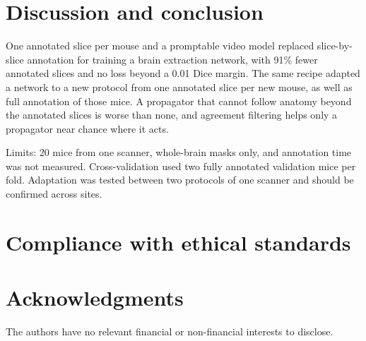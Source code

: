 \section{Discussion and conclusion}
\label{sec:discussion}
One annotated slice per mouse and a promptable video model replaced slice-by-slice annotation for training a brain extraction network, with 91\% fewer annotated slices and no loss beyond a 0.01 Dice margin. The same recipe adapted a network to a new protocol from one annotated slice per new mouse, as well as full annotation of those mice. A propagator that cannot follow anatomy beyond the annotated slices is worse than none, and agreement filtering helps only a propagator near chance where it acts.

Limits: 20 mice from one scanner, whole-brain masks only, and annotation time was not measured. Cross-validation used two fully annotated validation mice per fold. Adaptation was tested between two protocols of one scanner and should be confirmed across sites.

\section{Compliance with ethical standards}
\label{sec:ethics}

\section{Acknowledgments}
\label{sec:acknowledgments}
 The authors have no relevant financial or non-financial interests to disclose.

